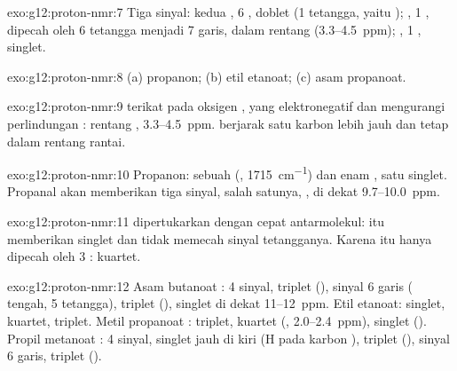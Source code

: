 \begin{solution}{exo:g12:proton-nmr:7}
Tiga sinyal: kedua , 6 , doblet (1 tetangga,
yaitu ); , 1 , dipecah oleh 6 tetangga menjadi 7
garis, dalam rentang  (3.3--\qty{4.5}{ppm}); , 1
, singlet.
\end{solution}

\begin{solution}{exo:g12:proton-nmr:8}
(a) propanon; (b) etil etanoat; (c) asam propanoat.
\end{solution}

\begin{solution}{exo:g12:proton-nmr:9}
 terikat pada  oksigen , yang elektronegatif dan
mengurangi perlindungan : rentang ,
3.3--\qty{4.5}{ppm}.  berjarak satu karbon lebih jauh dan tetap
dalam rentang rantai.
\end{solution}

\begin{solution}{exo:g12:proton-nmr:10}
Propanon: sebuah  (, \qty{1715}{cm^{-1}}) dan enam , satu singlet. Propanal akan memberikan tiga sinyal, salah
satunya,   , di dekat
9.7--\qty{10.0}{ppm}.
\end{solution}

\begin{solution}{exo:g12:proton-nmr:11}
  dipertukarkan dengan cepat antarmolekul:  itu
memberikan singlet dan tidak memecah sinyal tetangganya. Karena itu
 hanya dipecah oleh 3  : kuartet.
\end{solution}

\begin{solution}{exo:g12:proton-nmr:12}
Asam butanoat : 4 sinyal, triplet (),
sinyal 6 garis ( tengah, 5 tetangga), triplet (),
singlet di dekat 11--\qty{12}{ppm}. Etil etanoat: singlet, kuartet,
triplet. Metil propanoat : triplet, kuartet
(, 2.0--\qty{2.4}{ppm}), singlet (). Propil
metanoat : 4 sinyal, singlet jauh di kiri (H
pada karbon ), triplet (), sinyal 6 garis, triplet
().
\end{solution}

